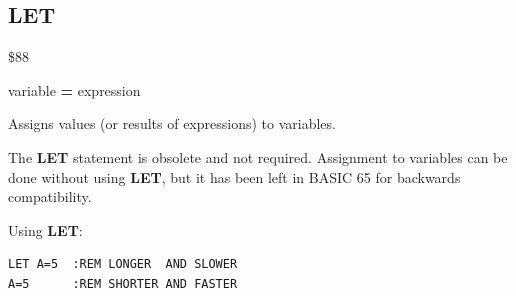 
\newpage
\subsection{LET}
\begin{description}[leftmargin=2cm,style=nextline]
\item [Token:] \$88
\item [Format:] [{\bf LET}] variable {\bf=} expression
\item [Usage:] Assigns values (or results of expressions) to variables.
\item [Remarks:] The {\bf LET} statement is obsolete and not required.
               Assignment to variables can be done without using
               {\bf LET}, but it has been left in BASIC 65 for backwards compatibility.

\item [Examples:] Using {\bf LET}:
\begin{tcolorbox}[colback=black,coltext=white]
\verbatimfont{\codefont}
\begin{verbatim}
LET A=5  :REM LONGER  AND SLOWER
A=5      :REM SHORTER AND FASTER
\end{verbatim}
\end{tcolorbox}
\end{description}


\newpage
